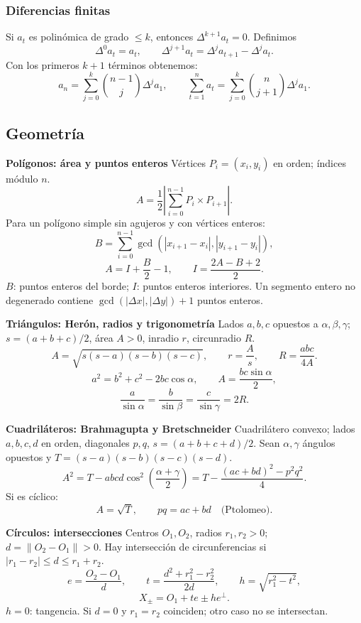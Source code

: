 \subsubsection{Diferencias finitas}
Si $a_t$ es polinómica de grado $\le k$, entonces
$\Delta^{k+1}a_t=0$. Definimos
\[
\Delta^0a_t=a_t,\qquad
\Delta^{j+1}a_t=\Delta^ja_{t+1}-\Delta^ja_t.
\]
Con los primeros $k+1$ términos obtenemos:
\[
a_n=\sum_{j=0}^{k}\binom{n-1}{j}\Delta^ja_1,
\qquad
\sum_{t=1}^{n}a_t
=\sum_{j=0}^{k}\binom{n}{j+1}\Delta^ja_1.
\]



\subsection{Geometría}


\textbf{Polígonos: área y puntos enteros}
Vértices $P_i=(x_i,y_i)$ en orden; índices módulo $n$.
\[
A=\frac12\left|\sum_{i=0}^{n-1}P_i\times P_{i+1}\right|.
\]
Para un polígono simple sin agujeros y con vértices enteros:
\[
B=\sum_{i=0}^{n-1}
\gcd(|x_{i+1}-x_i|,|y_{i+1}-y_i|),
\]
\[
A=I+\frac B2-1,\qquad I=\frac{2A-B+2}{2}.
\]
$B$: puntos enteros del borde; $I$: puntos enteros interiores.
Un segmento entero no degenerado contiene
$\gcd(|\Delta x|,|\Delta y|)+1$ puntos enteros.


\textbf{Triángulos: Herón, radios y trigonometría}
Lados $a,b,c$ opuestos a $\alpha,\beta,\gamma$;
$s=(a+b+c)/2$, área $A>0$, inradio $r$, circunradio $R$.
\[
A=\sqrt{s(s-a)(s-b)(s-c)},\qquad
r=\frac As,\qquad R=\frac{abc}{4A}.
\]
\[
a^2=b^2+c^2-2bc\cos\alpha,\qquad
A=\frac{bc\sin\alpha}{2},
\]
\[
\frac a{\sin\alpha}=\frac b{\sin\beta}
=\frac c{\sin\gamma}=2R.
\]

\textbf{Cuadriláteros: Brahmagupta y Bretschneider}
Cuadrilátero convexo; lados $a,b,c,d$ en orden,
diagonales $p,q$, $s=(a+b+c+d)/2$.
Sean $\alpha,\gamma$ ángulos opuestos y
$T=(s-a)(s-b)(s-c)(s-d)$.
\[
A^2=T-abcd\cos^2\!\left(\frac{\alpha+\gamma}{2}\right)
=T-\frac{(ac+bd)^2-p^2q^2}{4}.
\]
Si es cíclico:
\[
A=\sqrt T,\qquad pq=ac+bd\quad\text{(Ptolomeo)}.
\]

\textbf{Círculos: intersecciones}
Centros $O_1,O_2$, radios $r_1,r_2>0$;
$d=\|O_2-O_1\|>0$. Hay intersección de circunferencias
si $|r_1-r_2|\le d\le r_1+r_2$.
\[
e=\frac{O_2-O_1}{d},\qquad
t=\frac{d^2+r_1^2-r_2^2}{2d},\qquad
h=\sqrt{r_1^2-t^2},
\]
\[
X_\pm=O_1+te\pm he^\perp.
\]
$h=0$: tangencia. Si $d=0$ y $r_1=r_2$ coinciden;
otro caso no se intersectan.



